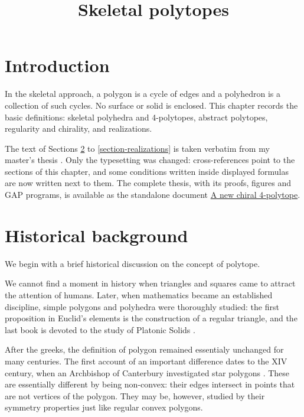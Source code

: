 



\title{Skeletal polytopes}
\maketitle

\label{section-phantom}

\tableofcontents

\section{Introduction}
\label{section-introduction}

\noindent
In the skeletal approach, a polygon is a
cycle of edges and a polyhedron is a
collection of such cycles. No surface or
solid is enclosed. This chapter records the
basic definitions: skeletal polyhedra and
4-polytopes, abstract polytopes, regularity
and chirality, and realizations.

The text of Sections
\ref{section-historical-background} to
\ref{section-realizations} is taken
verbatim from my master's thesis
\cite{gca-tesina}. Only the typesetting was
changed: cross-references point to the
sections of this chapter, and some conditions
written inside displayed formulas are now
written next to them. The complete thesis,
with its proofs, figures and GAP programs, is
available as the standalone document
\href{https://www.heap-project.org/standalone/chiral-4-polytope.pdf}{A
new chiral 4-polytope}.

\section{Historical background}
\label{section-historical-background}

\noindent
We begin with a brief historical discussion
on the concept of polytope.

We cannot find a moment in history when
triangles and squares came to attract the
attention of humans. Later, when mathematics
became an established discipline, simple
polygons and polyhedra were thoroughly
studied: the first proposition in Euclid's
elements is the construction of a regular
triangle, and the last book is devoted to the
study of Platonic Solids \cite{euclid}.

After the greeks, the definition of polygon
remained essentialy unchanged for many
centuries. The first account of an important
difference dates to the XIV century, when an
Archbishop of Canterbury investigated star
polygons \cite{abstract-polytopes}. These are
essentially different by being non-convex:
their edges intersect in points that are not
vertices of the polygon. They may be,
however, studied by their symmetry properties
just like regular convex polygons.

